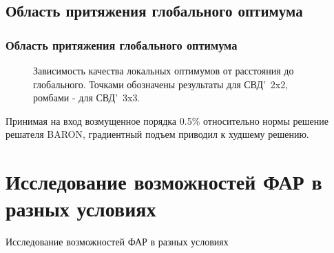 \subsection{Область притяжения глобального оптимума}
\begin{frame}
    \frametitle{Область притяжения глобального оптимума}

    \begin{figure}
    \centering
        \begin{minipage}[h]{0.8\linewidth}
        \end{minipage}
        \vspace{0.7em}
        \caption{Зависимость качества локальных оптимумов от расстояния до глобального. Точками обозначены результаты для СВД'~2x2, ромбами - для СВД'~3x3.}
        \label{ris:fit_dist_2}
    \end{figure}

    Принимая на вход возмущенное порядка 0.5\% относительно нормы решение решателя BARON, градиентный подъем приводил к худшему решению.
\end{frame}



\section{Исследование возможностей ФАР в разных условиях}
\begin{frame}
    \begin{center}
        \Huge
        Исследование возможностей ФАР в разных условиях
    \end{center}
\end{frame}

